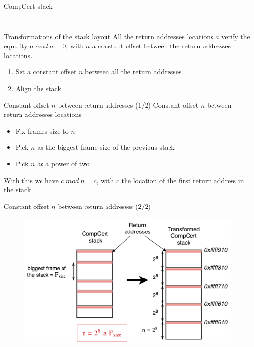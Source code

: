 \documentclass{beamer}
\begin{document}
\begin{frame}[c]{CompCert stack}
\begin{columns}
\begin{column}{0.45\textwidth}
\begin{figure}
			\end{figure}
		\end{column}
	\end{columns}
\end{frame}


\begin{frame}[c]{Transformations of the stack layout}
	All the return addresses locations $a$ verify the equality $a~mod~n=0$, with $n$ a constant offset between the return addresses locations.
	\begin{enumerate}
		\item Set a constant offset $n$ between all the return addresses
		\item Align the stack
	\end{enumerate}
\end{frame}

\begin{frame}[c]{Constant offset $n$ between return addresses (1/2)}
	Constant offset $n$ between return addresses locations
	\begin{itemize}
		\item Fix frames size to $n$
		\item Pick $n$ as the biggest frame size of the previous stack
		\item Pick $n$ as a power of two
	\end{itemize}
	With this we have $a~mod~n=c$, with $c$ the location of the first return address in the stack
\end{frame}

\begin{frame}[c]{Constant offset $n$ between return addresses (2/2)}
	\begin{figure}
	\centering
	\includegraphics[width=\textwidth]{images/stack_transform.pdf}
	\end{figure}
\end{frame}
\end{document}
